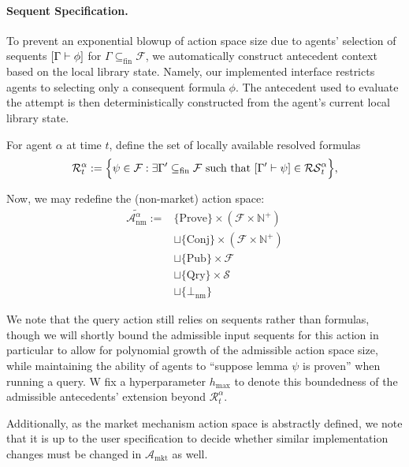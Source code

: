 \paragraph{Sequent Specification.}
To prevent an exponential blowup of action space size due to agents' selection of sequents $[\Gamma \vdash \phi]$ for $\Gamma \subseteq_{\mathrm{fin}} \mathcal{F}$, we automatically construct antecedent context based on the local library state. Namely, our implemented interface restricts agents to selecting only a consequent formula $\phi$. The antecedent used to evaluate the attempt is then deterministically constructed from the agent's current local library state.

For agent $\alpha$ at time $t$, define the set of locally available resolved formulas
\[
\mathcal{R}^\alpha_t
:= \Big\{\psi\in\mathcal{F}:\exists \Gamma'\subseteq_{\mathrm{fin}}\mathcal{F}\text{ such that }[\Gamma'\vdash \psi]\in\mathcal{RS}^\alpha_t\Big\},
\]

Now, we may redefine the (non-market) action space:
\begin{align*}
\widetilde{\mathcal{A}_{\mathrm{nm}}^\alpha}
:=
&
\{\mathrm{Prove}\}\times(\mathcal{F}\times\mathbb{N}^+)
\\&\sqcup
\{\mathrm{Conj}\}\times(\mathcal{F}\times\mathbb{N}^+)
\\&\sqcup
\{\mathrm{Pub}\}\times\mathcal{F}
\\&\sqcup
\{\mathrm{Qry}\}\times \mathcal{S}
\\&\sqcup\{\bot_{\mathrm{nm}}\}
\end{align*}

We note that the query action still relies on sequents rather than formulas, though we will shortly bound the admissible input sequents for this action in particular to allow for polynomial growth of the admissible action space size, while maintaining the ability of agents to ``suppose lemma $\psi$ is proven'' when running a query. W fix a hyperparameter $h_{\mathrm{max}}$ to denote this boundedness of the admissible antecedents' extension beyond $\mathcal{R}^\alpha_t$.

Additionally, as the market mechanism action space is abstractly defined, we note that it is up to the user specification to decide whether similar implementation changes must be changed in $\mathcal{A}_{\mathrm{mkt}}$ as well.

